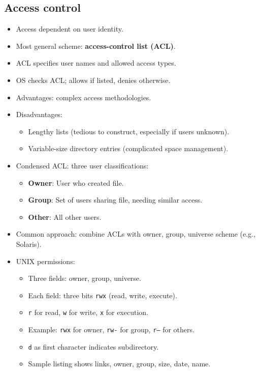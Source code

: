 \subsection{Access control}
\begin{itemize}
    \item Access dependent on user identity.
    \item Most general scheme: \textbf{access-control list (ACL)}.
    \item ACL specifies user names and allowed access types.
    \item OS checks ACL; allows if listed, denies otherwise.
    \item Advantages: complex access methodologies.
    \item Disadvantages:
    \begin{itemize}
        \item Lengthy lists (tedious to construct, especially if users unknown).
        \item Variable-size directory entries (complicated space management).
    \end{itemize}
    \item Condensed ACL: three user classifications:
    \begin{itemize}
        \item \textbf{Owner}: User who created file.
        \item \textbf{Group}: Set of users sharing file, needing similar access.
        \item \textbf{Other}: All other users.
    \end{itemize}
    \item Common approach: combine ACLs with owner, group, universe scheme (e.g., Solaris).
    \item UNIX permissions:
    \begin{itemize}
        \item Three fields: owner, group, universe.
        \item Each field: three bits \texttt{rwx} (read, write, execute).
        \item \texttt{r} for read, \texttt{w} for write, \texttt{x} for execution.
        \item Example: \texttt{rwx} for owner, \texttt{rw-} for group, \texttt{r--} for others.
        \item \texttt{d} as first character indicates subdirectory.
        \item Sample listing shows links, owner, group, size, date, name.

\end{itemize}
\end{itemize}
